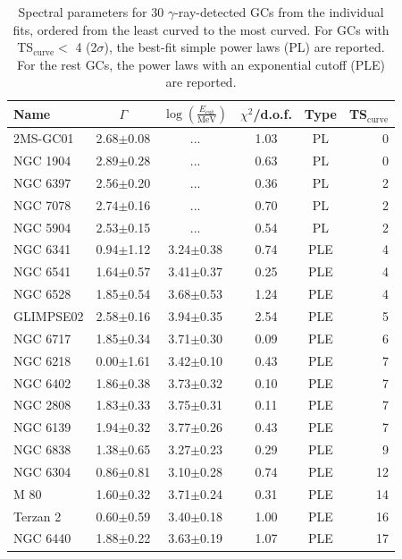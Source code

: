 \documentclass[doublespace,nopageskip]{VTthesis} %
\begin{document}
\begin{table}
\centering
\caption{Spectral parameters for 30 $\gamma$-ray-detected GCs from the individual fits, ordered from the least curved to the most curved. For GCs with TS$_\mathrm{curve} <$ 4 (2$\sigma$), the best-fit simple power laws (PL) are reported. For the rest GCs, the power laws with an exponential cutoff (PLE) are reported. }\label{tab:spectra}
\begin{threeparttable}
\begin{tabular}{lccccr}
\hline
Name&$\Gamma$ & $\log\left(\frac{E_\mathrm{cut}}{\mathrm{MeV}}\right)$ & $\chi^2$/d.o.f. & Type\tnote{a} & TS$_\mathrm{curve}$\\
\hline
2MS-GC01 & {2.68$\pm$0.08} & ... & 1.03 & PL & 0 \\
NGC 1904 & {2.89$\pm$0.28} & ... & 0.63 & PL & 0 \\
NGC 6397 & {2.56$\pm$0.20} & ... & 0.36 & PL & 2 \\
NGC 7078 & {2.74$\pm$0.16} & ... & 0.70 & PL & 2 \\
NGC 5904 & {2.53$\pm$0.15} & ... & 0.54 & PL & 2 \\
\hline
NGC 6341 & 0.94$\pm$1.12 & {3.24$\pm$0.38} & 0.74 & PLE & 4 \\
NGC 6541 & 1.64$\pm$0.57 & {3.41$\pm$0.37} & 0.25 & PLE & 4 \\
NGC 6528 & 1.85$\pm$0.54 & {3.68$\pm$0.53} & 1.24 & PLE & 4 \\
GLIMPSE02 & 2.58$\pm$0.16 & {3.94$\pm$0.35} & 2.54 & PLE & 5 \\
NGC 6717 & 1.85$\pm$0.34 & {3.71$\pm$0.30} & 0.09 & PLE & 6 \\
NGC 6218 & 0.00$\pm$1.61 & {3.42$\pm$0.10} & 0.43 & PLE & 7 \\
NGC 6402 & 1.86$\pm$0.38 & {3.73$\pm$0.32} & 0.10 & PLE & 7 \\
NGC 2808 & 1.83$\pm$0.33 & {3.75$\pm$0.31} & 0.11 & PLE & 7 \\
NGC 6139 & 1.94$\pm$0.32 & {3.77$\pm$0.26} & 0.43 & PLE & 7 \\
NGC 6838 & 1.38$\pm$0.65 & {3.27$\pm$0.23} & 0.29 & PLE & 9 \\
NGC 6304 & 0.86$\pm$0.81 & {3.10$\pm$0.28} & 0.74 & PLE & 12 \\
M 80 & 1.60$\pm$0.32 & {3.71$\pm$0.24} & 0.31 & PLE & 14 \\
Terzan 2 & 0.60$\pm$0.59 & {3.40$\pm$0.18} & 1.00 & PLE & 16 \\
NGC 6440 & 1.88$\pm$0.22 & {3.63$\pm$0.19} & 1.07 & PLE & 17 \\

\end{tabular}
\end{threeparttable}
\end{table}
\end{document}
